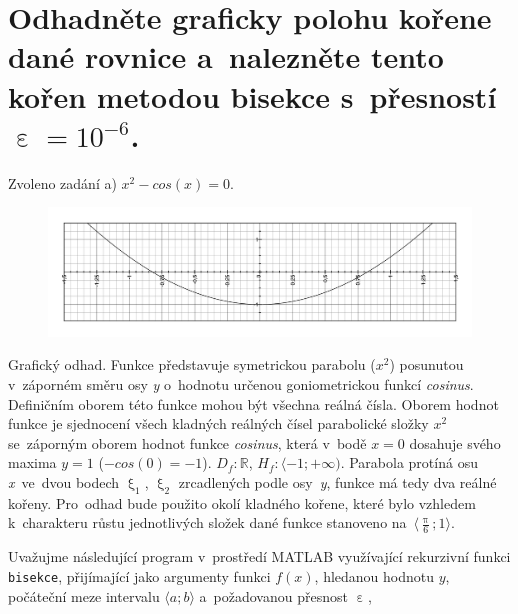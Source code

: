 \documentclass[a4paper,10pt]{article}
\author{Bc. Jan Hladěna}
\begin{document}
\pagestyle{fancy}



\section{Odhadněte graficky polohu kořene dané rovnice a~nalezněte tento kořen metodou
bisekce s~přesností $\upepsilon=10^{-6}$.}

\par Zvoleno zadání a) $x^{2}-cos(x)=0$.
\vfill


\begin{figure}[!h]
  \begin{center}
    \includegraphics[width=.95\textwidth]{graf1}
  \end{center}
\end{figure}

\par Grafický odhad. Funkce představuje symetrickou parabolu ($x^{2}$) posunutou
v~záporném směru osy \emph{y} o~hodnotu určenou goniometrickou funkcí \emph{cosinus}.
Definičním oborem této funkce mohou být všechna reálná čísla. Oborem hodnot funkce je
sjednocení všech kladných reálných čísel parabolické složky $x^{2}$ se~záporným oborem
hodnot funkce \emph{cosinus}, která v~bodě $x=0$ dosahuje svého maxima $y=1$
($-cos(0)=-1$). $D_f:\mathbb{R}$, $H_f:\langle-1; +\infty)$. Parabola protíná osu
\emph{x}~ve~dvou bodech $\upxi_{1}$, $\upxi_{2}$ zrcadlených podle osy~\emph{y}, funkce
má tedy dva reálné kořeny. Pro~odhad bude použito okolí kladného kořene, které bylo
vzhledem k~charakteru růstu jednotlivých složek dané funkce stanoveno
na~$\langle\frac{\uppi}{6}; 1\rangle$.

\par Uvažujme následující program v~prostředí MATLAB využívající rekurzivní funkci
\texttt{bisekce}, přijímající jako argumenty funkci $f\left(x\right)$, hledanou hodnotu
$y$, počáteční meze intervalu $\langle{a}; b\rangle$ a~požadovanou přesnost $\upepsilon$,
\end{document}
